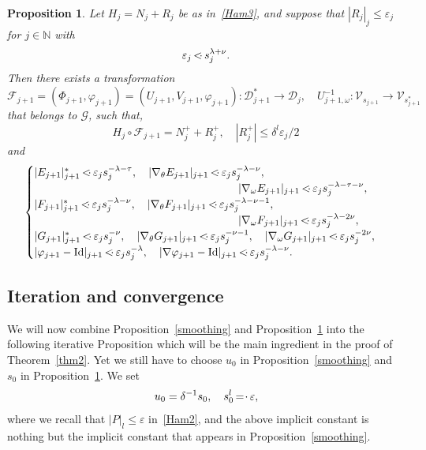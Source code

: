\documentclass[JEP,XML,SOM,Unicode]{cedram}
\let\mathcal\mathscr
\numberwithin{equation}{section}
\theoremstyle{plain}
\newtheorem{proposition}[theorem]{Proposition}
\theoremstyle{definition}
\newcommand{\N}{\mathbb{N}}
\newcommand\MP{\,{<\hspace{-.5em}\cdot}\,}
\newcommand\EP{\,{=\hspace{-.2em}\cdot}\,}
\begin{document}
\begin{proposition}\label{Posj}
Let $H_j=N_j+R_j$ be as in~\eqref{Ham3}, and suppose that $|R_j|_{j} \leq \varepsilon_j$ for $j \in \N$ with
\begin{equation}\label{seuilj}
\varepsilon_j \MP s_j^{\lambda+\nu}.
\end{equation}
Then there exists a transformation
\[ \mathcal{F}_{j+1}=(\Phi_{j+1},\varphi_{j+1})=(U_{j+1},V_{j+1},\varphi_{j+1}) : \mathcal{D}_{j+1}^* \to \mathcal{D}_j, \quad U_{j+1,\omega}^{-1}: \mathcal{V}_{s_{j+1}} \to \mathcal{V}_{s_{j+1}^*}\]
that belongs to $\mathcal{G}$, such that,
\begin{equation}\label{estim1j}
H_j \circ \mathcal{F}_{j+1}=N_j^++R_j^+, \quad |R_j^+| \leq \delta^l\varepsilon_j/2
\end{equation}
and
\begin{equation}\label{estim2j}
\begin{cases}
|E_{j+1}|_{j+1}^* \MP \varepsilon_js_j^{-\lambda-\tau}, \quad |\nabla_\theta E_{j+1}|_{j+1} \MP \varepsilon_js_j^{-\lambda-\nu}, \\
\hspace*{6.5cm} |\nabla_\omega E_{j+1}|_{j+1} \MP \varepsilon_js_j^{-\lambda-\tau-\nu},\\
|F_{j+1}|_{j+1}^* \MP \varepsilon_js_j^{-\lambda-\nu}, \quad |\nabla_\theta F_{j+1}|_{j+1} \MP \varepsilon_js_j^{-\lambda-\nu-1}, \\
\hspace*{6.5cm} |\nabla_\omega F_{j+1}|_{j+1} \MP \varepsilon_js_j^{-\lambda-2\nu}, \\
|G_{j+1}|_{j+1}^* \MP \varepsilon_js_j^{-\nu}, \quad |\nabla_\theta G_{j+1}|_{j+1} \MP \varepsilon_js_j^{-\nu-1}, \quad |\nabla_\omega G_{j+1}|_{j+1} \MP \varepsilon_js_j^{-2\nu}, \\
|\varphi_{j+1}-\mathrm{Id}|_{j+1} \MP \varepsilon_j s_j^{-\lambda}, \quad |\nabla \varphi_{j+1}-\mathrm{Id}|_{j+1} \MP \varepsilon_j s_j^{-\lambda-\nu}.
\end{cases}
\end{equation}
\end{proposition}

\subsection{Iteration and convergence}

We will now combine Proposition~\ref{smoothing} and Proposition~\ref{Posj} into the following iterative Proposition which will be the main ingredient in the proof of Theorem~\ref{thm2}. Yet we still have to choose $u_0$ in Proposition~\ref{smoothing} and $s_0$ in Proposition~\ref{Posj}. We set
\begin{equation}\label{s0}
u_0=\delta^{-1} s_0, \quad s_0^l \EP \varepsilon,
\end{equation}
where we recall that $|P|_l \leq \varepsilon$ in~\eqref{Ham2}, and the above implicit constant is nothing but the implicit constant that appears in Proposition~\ref{smoothing}.
\end{document}
